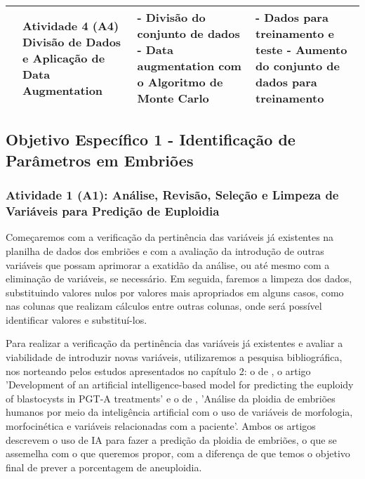 \begin{table}[h!]
{\begin{tabular}{|p{3cm}|p{4cm}|p{3cm}|p{5cm}|}
      & 
      \textcolor[HTML]{133E78}{\textbf{Atividade 4 (A4)}} \newline
      Divisão de Dados e Aplicação de Data Augmentation & 
      - Divisão do conjunto de dados \newline
      - Data augmentation com o Algoritmo de Monte Carlo &
      - Dados para treinamento e teste \newline
      - Aumento do conjunto de dados para treinamento \\
      \hline
    \end{tabular}
  }
\end{table}
\FloatBarrier 

\subsection{\textbf{Objetivo Específico 1} - Identificação de Parâmetros em Embriões}

\subsubsection{\textbf{Atividade 1 (A1):} Análise, Revisão, Seleção e Limpeza de Variáveis para Predição de Euploidia}

Começaremos com a verificação da pertinência das variáveis já existentes na planilha de dados dos embriões e com a avaliação da introdução de outras variáveis que possam aprimorar a exatidão da análise, ou até mesmo com a eliminação de variáveis, se necessário. Em seguida, faremos a limpeza dos dados, substituindo valores nulos por valores mais apropriados em alguns casos, como nas colunas que realizam cálculos entre outras colunas, onde será possível identificar valores e substituí-los.

Para realizar a verificação da pertinência das variáveis já existentes e avaliar a viabilidade de introduzir novas variáveis, utilizaremos a pesquisa bibliográfica, nos norteando pelos estudos apresentados no capítulo 2: o de , o artigo 'Development of an artificial intelligence-based model for predicting the euploidy of blastocysts in PGT-A treatments' e o de , 'Análise da ploidia de embriões humanos por meio da inteligência artificial com o uso de variáveis de morfologia, morfocinética e variáveis relacionadas com a paciente'. Ambos os artigos descrevem o uso de IA para fazer a predição da ploidia de embriões, o que se assemelha com o que queremos propor, com a diferença de que temos o objetivo final de prever a porcentagem de aneuploidia. 

